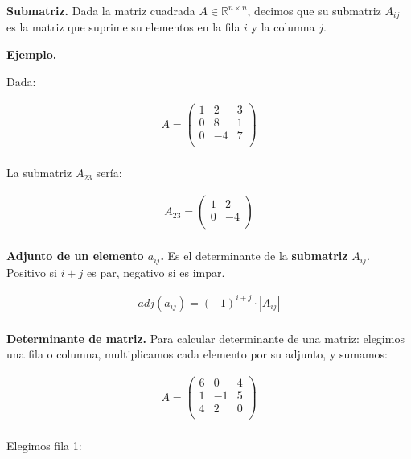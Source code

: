 \documentclass[12pt]{article}
\begin{document}
\textbf{Submatriz.}
Dada la matriz cuadrada \(A \in \mathbb{R}^{n \times n}\),
decimos que su submatriz \(A_{ij}\) es la matriz que suprime su elementos
en la fila \(i\) y la columna \(j\).

\textbf{Ejemplo.}

Dada:

\begin{align*}
  A = \begin{pmatrix}
        1 & 2  & 3 \\
        0 & 8  & 1 \\
        0 & -4 & 7 \\
      \end{pmatrix} \\
\end{align*}

La submatriz \(A_{23}\) sería:

\begin{align*}
  A_{23} = \begin{pmatrix}
             1 & 2  \\
             0 & -4 \\
           \end{pmatrix} \\
\end{align*}

\textbf{Adjunto de un elemento \(a_{ij}\).}
Es el determinante de la \textbf{submatriz} \(A_{ij}\).
Positivo si \(i + j\) es par, negativo si es impar.

\begin{align*}
  adj(a_{ij}) = (-1)^{i+j} \cdot |A_{ij}| \\
\end{align*}

\textbf{Determinante de matriz.}
Para calcular determinante de una matriz:
elegimos una fila o columna,
multiplicamos cada elemento por su adjunto,
y sumamos:

\begin{align*}
  A = \begin{pmatrix}
        6 & 0  & 4 \\
        1 & -1 & 5 \\
        4 & 2  & 0 \\
      \end{pmatrix} \\
\end{align*}

Elegimos fila 1:
\end{document}
